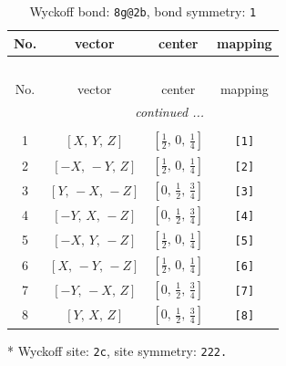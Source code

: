 \documentclass[fleqn,8pt]{jsarticle}
\begin{document}
\begin{longtable}{cccc}
\caption{Wyckoff bond: {\tt 8g@2b}, bond symmetry: {\tt 1}}
 \\
 \hline \hline
No. & vector & center & mapping \\ \hline \endfirsthead

\multicolumn{3}{l}{\tablename\ \thetable{}} \\
 \hline \hline
No. & vector & center & mapping \\ \hline \endhead

 \hline \hline
\multicolumn{3}{r}{\footnotesize\it continued ...} \\ \endfoot

 \hline \hline
\multicolumn{3}{r}{} \\ \endlastfoot

1 & $\left[ X,\, Y,\, Z \right]$ & $\left[ \frac{1}{2},\, 0,\, \frac{1}{4} \right]$ & {\tt [1]} \\ \hline
2 & $\left[ - X,\, - Y,\, Z \right]$ & $\left[ \frac{1}{2},\, 0,\, \frac{1}{4} \right]$ & {\tt [2]} \\ \hline
3 & $\left[ Y,\, - X,\, - Z \right]$ & $\left[ 0,\, \frac{1}{2},\, \frac{3}{4} \right]$ & {\tt [3]} \\ \hline
4 & $\left[ - Y,\, X,\, - Z \right]$ & $\left[ 0,\, \frac{1}{2},\, \frac{3}{4} \right]$ & {\tt [4]} \\ \hline
5 & $\left[ - X,\, Y,\, - Z \right]$ & $\left[ \frac{1}{2},\, 0,\, \frac{1}{4} \right]$ & {\tt [5]} \\ \hline
6 & $\left[ X,\, - Y,\, - Z \right]$ & $\left[ \frac{1}{2},\, 0,\, \frac{1}{4} \right]$ & {\tt [6]} \\ \hline
7 & $\left[ - Y,\, - X,\, Z \right]$ & $\left[ 0,\, \frac{1}{2},\, \frac{3}{4} \right]$ & {\tt [7]} \\ \hline
8 & $\left[ Y,\, X,\, Z \right]$ & $\left[ 0,\, \frac{1}{2},\, \frac{3}{4} \right]$ & {\tt [8]} \\
\end{longtable}
* Wyckoff site: {\tt 2c}, site symmetry: {\tt 222.}
\renewcommand{\arraystretch}{1.2}
\end{document}
